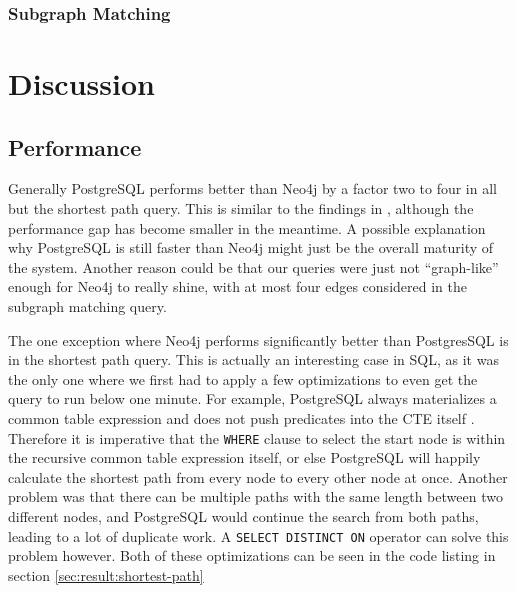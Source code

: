 \documentclass[11pt, a4paper,oneside,chapterprefix=false]{scrbook}
\begin{document}
\subsection{Subgraph Matching} \label{sec:result:subgraph-matching}





\chapter{Discussion} \label{chp:Discussion}

\section{Performance}

Generally PostgreSQL performs better than Neo4j by a factor two to four in all but the shortest path query.
This is similar to the findings in \cite{graphdbbenchmark}, although the performance gap has become smaller in the meantime.
A possible explanation why PostgreSQL is still faster than Neo4j might just be the overall maturity of the system.
Another reason could be that our queries were just not ``graph-like'' enough for Neo4j to really shine, with at most four edges considered in the subgraph matching query.

The one exception where Neo4j performs significantly better than PostgresSQL is in the shortest path query.
This is actually an interesting case in SQL, as it was the only one where we first had to apply a few optimizations to even get the query to run below one minute. For example, PostgreSQL always materializes a common table expression and does not push predicates into the CTE itself \cite{postgresMaterialize}.
Therefore it is imperative that the \lstinline{WHERE} clause to select the start node is within the recursive common table expression itself, or else PostgreSQL will happily calculate the shortest path from every node to every other node at once. Another problem was that there can be multiple paths with the same length between two different nodes, and PostgreSQL would continue the search from both paths, leading to a lot of duplicate work. A \lstinline{SELECT DISTINCT ON} operator can solve this problem however.
Both of these optimizations can be seen in the code listing in section \ref{sec:result:shortest-path}
\end{document}

